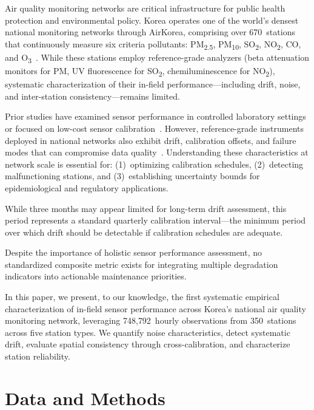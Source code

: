 \documentclass[12pt]{article}
\begin{document}
Air quality monitoring networks are critical infrastructure for public health protection and environmental policy. Korea operates one of the world's densest national monitoring networks through AirKorea, comprising over 670~stations that continuously measure six criteria pollutants: PM\textsubscript{2.5}, PM\textsubscript{10}, SO\textsubscript{2}, NO\textsubscript{2}, CO, and O\textsubscript{3}~\cite{kim2020airkorea}. While these stations employ reference-grade analyzers (beta attenuation monitors for PM, UV fluorescence for SO\textsubscript{2}, chemiluminescence for NO\textsubscript{2}), systematic characterization of their in-field performance---including drift, noise, and inter-station consistency---remains limited.

Prior studies have examined sensor performance in controlled laboratory settings~\cite{malings2020fine} or focused on low-cost sensor calibration~\cite{zimmerman2018machine, barkjohn2021development}. However, reference-grade instruments deployed in national networks also exhibit drift, calibration offsets, and failure modes that can compromise data quality~\cite{munir2019analysing}. Understanding these characteristics at network scale is essential for: (1)~optimizing calibration schedules, (2)~detecting malfunctioning stations, and (3)~establishing uncertainty bounds for epidemiological and regulatory applications.

While three months may appear limited for long-term drift assessment, this period represents a standard quarterly calibration interval---the minimum period over which drift should be detectable if calibration schedules are adequate.

Despite the importance of holistic sensor performance assessment, no standardized composite metric exists for integrating multiple degradation indicators into actionable maintenance priorities.

In this paper, we present, to our knowledge, the first systematic empirical characterization of in-field sensor performance across Korea's national air quality monitoring network, leveraging 748{,}792~hourly observations from 350~stations across five station types. We quantify noise characteristics, detect systematic drift, evaluate spatial consistency through cross-calibration, and characterize station reliability.

\section{Data and Methods}
\end{document}
